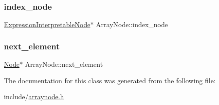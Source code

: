 \subsubsection{\texorpdfstring{index\+\_\+node}{index\_node}}
{\footnotesize\ttfamily \hyperlink{classExpressionInterpretableNode}{Expression\+Interpretable\+Node}$\ast$ Array\+Node\+::index\+\_\+node}

\mbox{\label{classArrayNode_aa3bccfaecfe5597fd494ee56cae918dd}} 
\subsubsection{\texorpdfstring{next\+\_\+element}{next\_element}}
{\footnotesize\ttfamily \hyperlink{classNode}{Node}$\ast$ Array\+Node\+::next\+\_\+element}



The documentation for this class was generated from the following file\+:\begin{DoxyCompactItemize}
\item 
include/\hyperlink{arraynode_8h}{arraynode.\+h}\end{DoxyCompactItemize}
